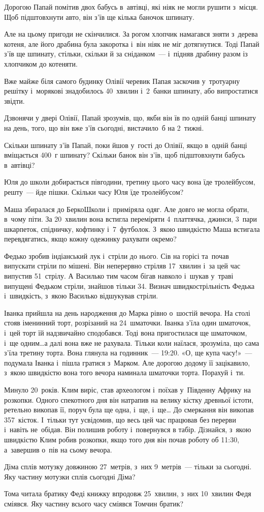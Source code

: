 Дорогою Папай помітив двох бабусь в~автівці, які ніяк не могли рушити
з~місця. Щоб підштовхнути авто, він з’їв ще кілька баночок шпинату.

Але на цьому пригоди не скінчилися. За рогом хлопчик намагався зняти
з~дерева котеня, але його драбина була закоротка і~він ніяк не міг
дотягнутися. Тоді Папай з’їв ще шпинату, стільки, скільки й
за сніданком~--- і~підняв драбину разом із хлопчиком до котеняти.

Вже майже біля самого будинку Олівії черевик Папая заскочив у~тротуарну
решітку і~морякові знадобилось 40~хвилин і~2~банки шпинату,
або випростатися звідти.

Дзвонячи у двері Олівії, Папай зрозумів, що, якби він їв по одній
банці шпинату на день, того, що він вже з’їв сьогодні,
вистачило~б на 2~тижні.

Скільки шпинату з’їв Папай, поки йшов у~гості до Олівії, якщо в~одній
банці вміщається 400~г шпинату?
Скільки банок він з’їв, щоб підштовхнути бабусь в~автівці?


\problem
Юля до школи добирається півгодини,
третину цього часу вона їде тролейбусом, решту~--- йде пішки.
Скільки часу Юля їде тролейбусом?


\problem
Маша збиралася до БеркоШколи і~приміряла одяг.
Але довго не могла обрати, в~чому піти.
За 20~хвилин вона встигла переміряти 4~платтячка, джинси, 3~пари шкарпеток,
спідничку, кофтинку і~7~футболок.
З~якою швидкістю Маша встигала перевдягатись,
якщо кожну одежинку рахувати окремо?


\problem
Федько зробив індіанський лук і~стріли до нього.
Сів на горісі та~почав випускати стріли по мішені.
Він неперервно стріляв 17~хвилин і~за цей час випустив 51~стрілу.
А Василько тим часом бігав навколо і~шукав у~траві випущені Федьком стріли,
знайшов тільки 34.
Визнач швидкострільність Федька і~швидкість, з~якою Василько
відшукував стріли.


\problem
Іванка прийшла на день народження до Марка рівно о~шостій вечора.
На столі стояв іменинний торт, розрізаний на 24~шматочки.
Іванка з’їла один шматочок, і~цей торт їй надзвичайно сподобався.
Тоді вона пригостилася ще шматочком, і~ще одним\ldots  а далі вона вже не рахувала.
Тільки коли наїлася, зрозуміла, що сама з’їла третину торта.
Вона глянула на годинник~--- 19:20.
«О, ще купа часу!»~--- подумала Іванка і~пішла гратися з~Марком.
Але дорогою додому її зацікавило, з~якою швидкістю вона того
вечора наминала шматочки торта. Порахуй і~ти.


\problem
Минуло 20~років. Клим виріс, став археологом і~поїхав у~Південну Африку
на розкопки. Одного спекотного дня він натрапив на велику кістку
древньої істоти, ретельно викопав її, поруч була ще одна, і~ще, і~ще\ldots
До смеркання він викопав 357~кісток. І~тільки тут усвідомив, що весь
цей час працював без перерви і~навіть не~обідав. Він полишив роботу
і~повернувся в табір. Дізнайся, з~якою швидкістю Клим робив розкопки,
якщо того дня він почав роботу об 11:30, а~завершив о~пів на сьому вечора.


\problem
Діма сплів мотузку довжиною 27~метрів, з~них 9~метрів~--- тільки за сьогодні.
Яку частину мотузки сплів сьогодні Діма?


\problem
Тома читала братику Феді книжку впродовж 25~хвилин,
з~них 10~хвилин Федя сміявся.
Яку частину всього часу сміявся Томчин братик?
